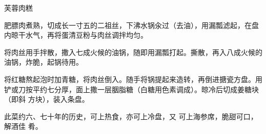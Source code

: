 \begin{recipe}{芙蓉肉糕}

\ingredients


\preparation

\step 肥膘肉煮熟，切成长一寸五的二祖丝，下沸水锅汆过（去油），用漏瓢滤起，在盘
内晾干水气，再将蛋清豆粉与肉丝调拌均匀。

\step 将肉丝用手拌散，撒入七成火候的油锅，随即用漏瓢打起。撕散，再入八成火候的
油锅，炸脆，起锅待用。

\step 将红糖熬起泡时加青糖，将肉丝倒入。随手将锅提起来造转，再倒进搪瓷方盘。用
铲或刀按平约七分厚，面上撒一层胭脂糖（白糖用色素调成）。晾冷后切成姜糖块（即斜
方块），装入条盘。

\features

此菜约六、七十年的历史，可上热食，亦可上冷盘，又 可上海参席，脆甜可口，解酒佳
肴。

\end{recipe}

